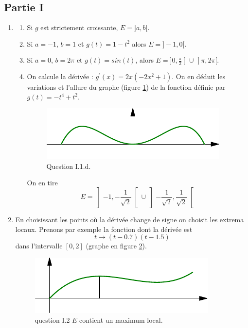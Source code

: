 \subsection*{Partie I}
\begin{enumerate} \item \begin{enumerate}
 \item Si $g$ est strictement croissante, $E=]a,b[$.
 \item Si $a=-1$, $b=1$ et $g(t) = 1-t^2$ alors $E=]-1,0[ $.
 \item Si $a=0$, $b=2\pi$ et $g(t) = sin(t)$, alors $E=] 0,\frac{\pi }{2}[ \, \cup \, ] \pi,2\pi [$.
 \item On calcule la d{\'e}riv{\'e}e : $g^{\prime}(x)=2x(-2x^{2}+1)$. On en déduit les variations et l'allure du graphe (figure \ref{Clebesg_1}) de la fonction définie par $g(t)=-t^{4}+t^{2}$. 
\begin{figure}[ht]
\centering
\includegraphics{Clebesg_1.pdf}
\caption{Question I.1.d.}
\label{Clebesg_1}
\end{figure}
On en tire
\begin{displaymath}
 E = \left]-1,-\frac{1}{\sqrt{2}}\right[  \cup \left] -\frac{1}{\sqrt{2}},\frac{1}{\sqrt{2}} \right[ 
\end{displaymath}
\end{enumerate}

\item En choisissant les points o{\`u} la d{\'e}riv{\'e}e change de signe on choisit les extrema locaux. Prenons par exemple la fonction dont la d{\'e}riv{\'e}e est 
\begin{displaymath}
 t\rightarrow (t-0.7)(t-1.5)
\end{displaymath}
dans l'intervalle $[0,2]$ (graphe en figure \ref{Clebesg_2}).
\begin{figure}[ht]
\centering
\includegraphics{Clebesg_2.pdf}
\caption{question I.2 $E$ contient un maximum local.}
\label{Clebesg_2}
\end{figure}


\end{enumerate}
